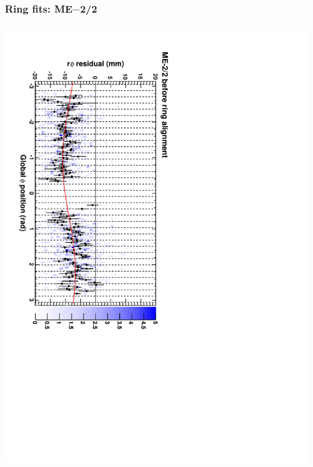 \documentclass[compress]{beamer}
\begin{document}
\begin{frame}
\frametitle{Ring fits: ME$-$2/2}
\vfill
\begin{columns}
\includegraphics[height=\linewidth, angle=90]{ringfits_before/mem22.pdf}


\end{columns}
\end{frame}
\end{document}
